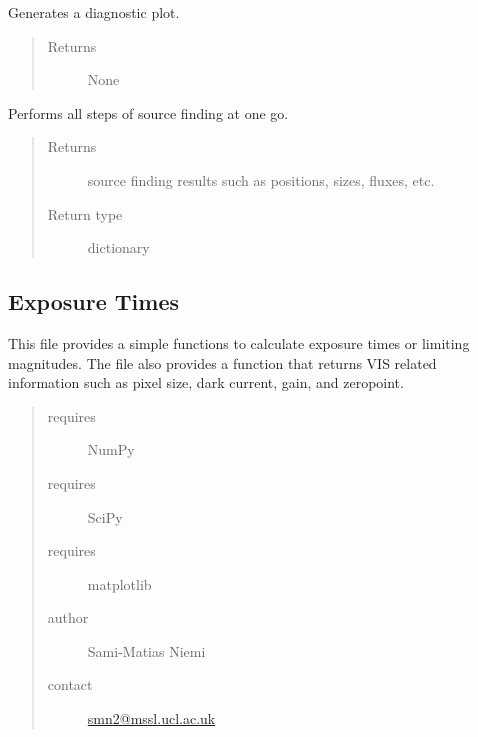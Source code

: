 \documentclass[a4paper,12pt,english]{sphinxmanual}
\begin{document}
\begin{fulllineitems}
\begin{fulllineitems}
Generates a diagnostic plot.
\begin{quote}\begin{description}
\item[{Returns}] \leavevmode
None

\end{description}\end{quote}

\end{fulllineitems}


\begin{fulllineitems}
Performs all steps of source finding at one go.
\begin{quote}\begin{description}
\item[{Returns}] \leavevmode
source finding results such as positions, sizes, fluxes, etc.

\item[{Return type}] \leavevmode
dictionary

\end{description}\end{quote}

\end{fulllineitems}


\end{fulllineitems}

\label{analysis:module-analysis.ETC}

\subsection{Exposure Times}
\label{analysis:exposure-times}
This file provides a simple functions to calculate exposure times or limiting magnitudes.
The file also provides a function that returns VIS related information such as pixel
size, dark current, gain, and zeropoint.
\begin{quote}\begin{description}
\item[{requires}] \leavevmode
NumPy

\item[{requires}] \leavevmode
SciPy

\item[{requires}] \leavevmode
matplotlib

\item[{author}] \leavevmode
Sami-Matias Niemi

\item[{contact}] \leavevmode
\href{mailto:smn2@mssl.ucl.ac.uk}{smn2@mssl.ucl.ac.uk}

\end{description}\end{quote}
\end{document}
